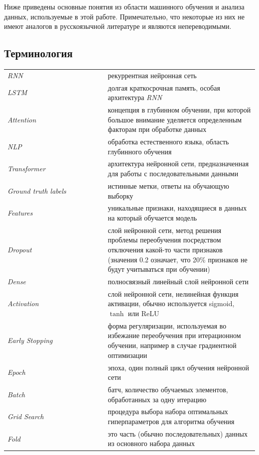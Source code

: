 \documentclass[14pt]{extarticle}
\begin{document}
Ниже приведены основные понятия из области машинного обучения и анализа данных, используемые в этой работе. Примечательно, что некоторые из них не имеют аналогов в русскоязычной литературе и являются непереводимыми. 

\subsection*{Терминология}

\begin{longtable}{p{0.4\linewidth}p{0.6\linewidth}}
	\hline
	\hline
	\label{glossary}
	{\it RNN}  & рекуррентная нейронная сеть \\[-2mm]
	{\it LSTM} & долгая краткосрочная память, особая архитектура {\it RNN} \\[-2mm]
	{\it Attention} & концепция в глубинном обучении, при которой большое внимание уделяется определенным факторам при обработке данных \\[-2mm]
	{\it NLP}  & обработка естественного языка, область глубинного обучения\\[-2mm]
	{\it Transformer}  & архитектура нейронной сети, предназначенная для работы с последовательными данными\\[-2mm]
	{\it Ground truth labels}  & истинные метки, ответы на обучающую выборку\\[-2mm]
	{\it Features}  & уникальные признаки, находящиеся в данных на который обучается модель\\[-2mm]
	{\it Dropout}  & слой нейронной сети, метод решения проблемы переобучения посредством отключения какой-то части признаков (значения 0.2 означает, что 20\% признаков не будут учитываться при обучении)\\[-2mm]
	{\it Dense}  & полносвязный линейный слой нейронной сети\\[-2mm]
	{\it Activation}  & слой нейронной сети, нелинейная функция активации, обычно используется sigmoid, $\tanh$ или ReLU\\[-2mm]
	{\it Early Stopping}  & форма регуляризации, используемая во избежание переобучения при итерационном обучении, например в случае градиентной оптимизации\\[-2mm]
	{\it Epoch}  & эпоха, один полный цикл обучения нейронной сети\\[-2mm]
	{\it Batch}  & батч, количество обучаемых элементов, обработанных за одну итерацию\\[-2mm]
	{\it Grid Search}  & процедура выбора набора оптимальных гиперпараметров для алгоритма обучения\\[-2mm]
	{\it Fold}  & это часть (обычно последовательных) данных из основного набора данных\\
	\hline
	\hline
\end{longtable}
 




\newpage
{}


\nocite{*}
\end{document}
